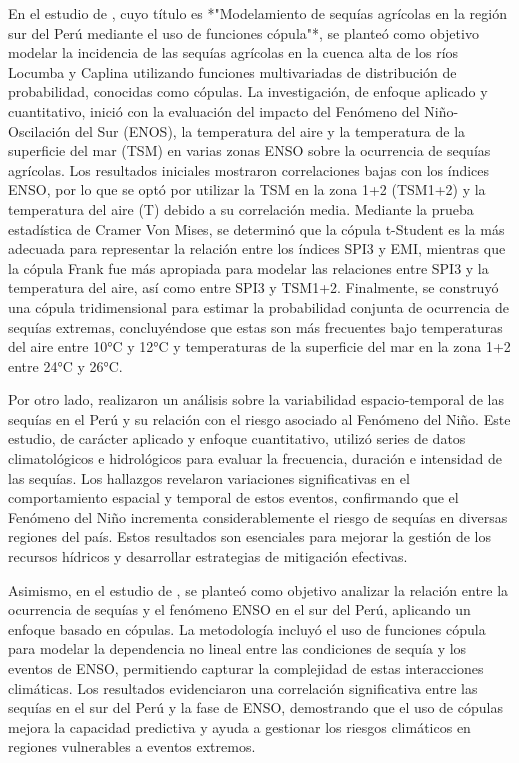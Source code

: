En el estudio de \textcite{Cabrera2023}, cuyo título es *"Modelamiento de sequías agrícolas en la región sur del Perú mediante el uso de funciones cópula"*, se planteó como objetivo modelar la incidencia de las sequías agrícolas en la cuenca alta de los ríos Locumba y Caplina utilizando funciones multivariadas de distribución de probabilidad, conocidas como cópulas. La investigación, de enfoque aplicado y cuantitativo, inició con la evaluación del impacto del Fenómeno del Niño-Oscilación del Sur (ENOS), la temperatura del aire y la temperatura de la superficie del mar (TSM) en varias zonas ENSO sobre la ocurrencia de sequías agrícolas. Los resultados iniciales mostraron correlaciones bajas con los índices ENSO, por lo que se optó por utilizar la TSM en la zona 1+2 (TSM1+2) y la temperatura del aire (T) debido a su correlación media. Mediante la prueba estadística de Cramer Von Mises, se determinó que la cópula t-Student es la más adecuada para representar la relación entre los índices SPI3 y EMI, mientras que la cópula Frank fue más apropiada para modelar las relaciones entre SPI3 y la temperatura del aire, así como entre SPI3 y TSM1+2. Finalmente, se construyó una cópula tridimensional para estimar la probabilidad conjunta de ocurrencia de sequías extremas, concluyéndose que estas son más frecuentes bajo temperaturas del aire entre 10°C y 12°C y temperaturas de la superficie del mar en la zona 1+2 entre 24°C y 26°C.

Por otro lado, \textcite{Cabrera2021} realizaron un análisis sobre la variabilidad espacio-temporal de las sequías en el Perú y su relación con el riesgo asociado al Fenómeno del Niño. Este estudio, de carácter aplicado y enfoque cuantitativo, utilizó series de datos climatológicos e hidrológicos para evaluar la frecuencia, duración e intensidad de las sequías. Los hallazgos revelaron variaciones significativas en el comportamiento espacial y temporal de estos eventos, confirmando que el Fenómeno del Niño incrementa considerablemente el riesgo de sequías en diversas regiones del país. Estos resultados son esenciales para mejorar la gestión de los recursos hídricos y desarrollar estrategias de mitigación efectivas.

Asimismo, en el estudio de \textcite{Cabrera2019}, se planteó como objetivo analizar la relación entre la ocurrencia de sequías y el fenómeno ENSO en el sur del Perú, aplicando un enfoque basado en cópulas. La metodología incluyó el uso de funciones cópula para modelar la dependencia no lineal entre las condiciones de sequía y los eventos de ENSO, permitiendo capturar la complejidad de estas interacciones climáticas. Los resultados evidenciaron una correlación significativa entre las sequías en el sur del Perú y la fase de ENSO, demostrando que el uso de cópulas mejora la capacidad predictiva y ayuda a gestionar los riesgos climáticos en regiones vulnerables a eventos extremos.

